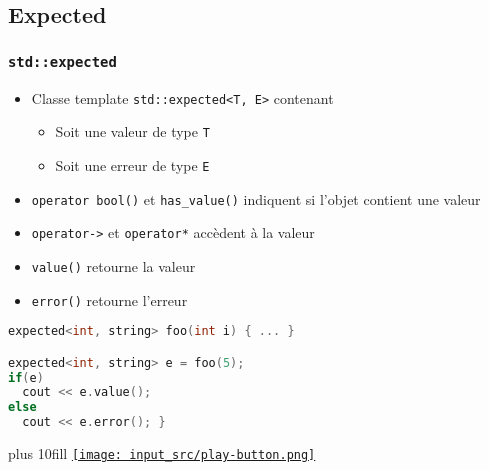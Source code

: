 \documentclass[C++.tex]{subfiles}
\begin{document}
\subsection*{Expected}
\begin{frame}[fragile]
	\frametitle{\lstinline|std::expected|}
	\begin{itemize}
		\item Classe template \lstinline|std::expected<T, E>| contenant
		\begin{itemize}
			\item Soit une valeur de type \lstinline|T|
			\item Soit une erreur de type \lstinline|E|
		\end{itemize}
		\item \lstinline|operator bool()| et \lstinline|has_value()| indiquent si l'objet contient une valeur
		\item \lstinline|operator->| et \lstinline|operator*| accèdent à la valeur 
		\item \lstinline|value()| retourne la valeur
		\item \lstinline|error()| retourne l'erreur
	\end{itemize}

	\begin{lstlisting}[language=C++]
expected<int, string> foo(int i) { ... }

expected<int, string> e = foo(5);
if(e)
  cout << e.value();
else
  cout << e.error(); }\end{lstlisting}

	\vskip 5mm plus 10fill
	\hfill
	\href{https://godbolt.org/#g:!((g:!((g:!((h:codeEditor,i:(filename:'1',fontScale:14,fontUsePx:'0',j:1,lang:c%2B%2B,selection:(endColumn:1,endLineNumber:30,positionColumn:1,positionLineNumber:30,selectionStartColumn:1,selectionStartLineNumber:1,startColumn:1,startLineNumber:1),source:'%23include+%3Ciostream%3E%0A%23include+%3Cexpected%3E%0A%23include+%3Cstring%3E%0A%0Astd::expected%3Cint,+std::string%3E+foo(int+i)%0A%7B%0A++if(i+%3E+0)%0A++%7B%0A++++return+i%3B%0A++%7D%0A++else%0A++%7B%0A++++return+std::unexpected%7B%22Nul%22%7D%3B%0A++%7D%0A%7D%0A%0Aint+main()%0A%7B%0A++std::expected%3Cint,+std::string%3E+e+%3D+foo(5)%3B%0A%0A++if(e)%0A++%7B%0A++++std::cout+%3C%3C+%22Val+:+%22+%3C%3C+e.value()+%3C%3C+%22%5Cn%22%3B%0A++%7D%0A++else%0A++%7B%0A++++std::cout+%3C%3C+%22Erreur+:+%22+%3C%3C+e.error()+%3C%3C+%22%5Cn%22%3B%0A++%7D%0A%7D%0A'),l:'5',n:'0',o:'C%2B%2B+source+%231',t:'0')),k:50,l:'4',n:'0',o:'',s:0,t:'0'),(g:!((h:executor,i:(argsPanelShown:'1',compilationPanelShown:'0',compiler:g122,compilerName:'',compilerOutShown:'0',execArgs:'',execStdin:'',fontScale:14,fontUsePx:'0',j:1,lang:c%2B%2B,libs:!(),options:'-std%3Dc%2B%2B23+-Wall+-Wextra+-pedantic',source:1,stdinPanelShown:'1',wrap:'1'),l:'5',n:'0',o:'Executor+x86-64+gcc+12.2+(C%2B%2B,+Editor+%231)',t:'0')),header:(),k:50,l:'4',n:'0',o:'',s:0,t:'0')),l:'2',n:'0',o:'',t:'0')),version:4}{\texttt{[image: input\_src/play-button.png]}}
\end{frame}
\end{document}
